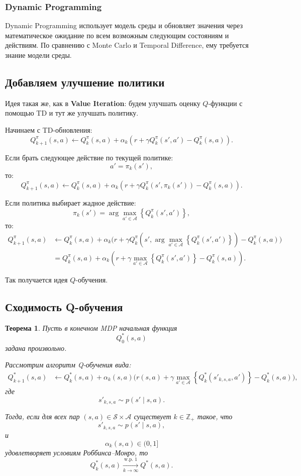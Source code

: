 \documentclass[12pt,a4paper]{article}
\newtheorem{theorem}{Теорема}
\begin{document}
\subsubsection{Dynamic Programming}

Dynamic Programming использует модель среды и обновляет значения через математическое ожидание по всем возможным следующим состояниям и действиям. По сравнению с Monte Carlo и Temporal Difference, ему требуется знание модели среды.

\subsection{Добавляем улучшение политики}

Идея такая же, как в \textbf{Value Iteration}: будем улучшать оценку $Q$-функции с помощью TD и тут же улучшать политику.

Начинаем с TD-обновления:
\[
Q_{k+1}^{\pi}(s,a)
\leftarrow
Q_k^{\pi}(s,a)
+
\alpha_k
\left(
r
+
\gamma Q_k^{\pi}(s',a')
-
Q_k^{\pi}(s,a)
\right).
\]

Если брать следующее действие по текущей политике:
\[
a' = \pi_k(s'),
\]
то:
\[
Q_{k+1}^{\pi}(s,a)
\leftarrow
Q_k^{\pi}(s,a)
+
\alpha_k
\left(
r
+
\gamma Q_k^{\pi}(s',\pi_k(s'))
-
Q_k^{\pi}(s,a)
\right).
\]

Если политика выбирает жадное действие:
\[
\pi_k(s')
=
\arg\max_{a' \in \mathcal A}
\left\{
Q_k^{\pi}(s',a')
\right\},
\]
то:
\[
\begin{aligned}
Q_{k+1}^{\pi}(s,a)
&\leftarrow
Q_k^{\pi}(s,a)
+
\alpha_k
\Bigg(
r
+
\gamma
Q_k^{\pi}
\left(
s',
\arg\max_{a' \in \mathcal A}
\left\{
Q_k^{\pi}(s',a')
\right\}
\right)
-
Q_k^{\pi}(s,a)
\Bigg)
\\
&=
Q_k^{\pi}(s,a)
+
\alpha_k
\left(
r
+
\gamma
\max_{a' \in \mathcal A}
\left\{
Q_k^{\pi}(s',a')
\right\}
-
Q_k^{\pi}(s,a)
\right).
\end{aligned}
\]

Так получается идея $Q$-обучения.

\subsection{Сходимость Q-обучения}

\begin{theorem}
Пусть в конечном MDP начальная функция
\[
Q_0^\ast(s,a)
\]
задана произвольно.

Рассмотрим алгоритм Q-обучения вида:
\[
\begin{aligned}
Q_{k+1}^\ast(s,a)
&\leftarrow
Q_k^\ast(s,a)
+
\alpha_k(s,a)
\Bigg(
r(s,a)
+
\gamma
\max_{a' \in \mathcal A}
\left\{
Q_k^\ast(s'_{k,s,a},a')
\right\}
-
Q_k^\ast(s,a)
\Bigg),
\end{aligned}
\]
где
\[
s'_{k,s,a}
\sim
p(s'\mid s,a).
\]

Тогда, если для всех пар $(s,a) \in \mathcal S \times \mathcal A$ существует $k \in \mathbb Z_+$ такое, что
\[
s'_{k,s,a}
\sim
p(s'\mid s,a),
\]
и
\[
\alpha_k(s,a) \in (0,1]
\]
удовлетворяет условиям Роббинса--Монро, то
\[
Q_k^\ast(s,a)
\xrightarrow[k\to\infty]{\text{w.p. }1}
Q^\ast(s,a).
\]
\end{theorem}
\end{document}
